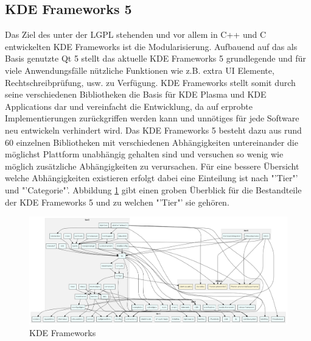 \subsection{KDE Frameworks 5}
Das Ziel des unter der LGPL stehenden und vor allem in C++ und C entwickelten KDE Frameworks ist die Modularisierung. Aufbauend auf das als Basis genutzte Qt 5 stellt das aktuelle KDE Frameworks 5 grundlegende und für viele Anwendungsfälle nützliche Funktionen wie z.B. extra UI Elemente, Rechtschreibprüfung, usw. zu Verfügung. KDE Frameworks stellt somit durch seine verschiedenen Bibliotheken die Basis für KDE Plasma und KDE Applications dar und vereinfacht die Entwicklung, da auf erprobte Implementierungen zurückgriffen werden kann und unnötiges für jede Software neu entwickeln verhindert wird. Das KDE Frameworks 5 besteht dazu aus rund 60 einzelnen Bibliotheken mit verschiedenen Abhängigkeiten untereinander die möglichst Plattform unabhängig gehalten sind und versuchen so wenig wie möglich zusätzliche Abhängigkeiten zu verursachen. Für eine bessere Übersicht welche Abhängigkeiten existieren erfolgt dabei eine Einteilung ist nach "'Tier"' und "'Categorie"'. Abbildung \ref{fig:kde_frameworks} gibt einen groben Überblick für die Bestandteile der KDE Frameworks 5 und zu welchen "'Tier"' sie gehören.

\begin{figure}[h]
	\centering
	\includegraphics[width=\columnwidth]{images/kf5_big_0.png}
	\caption{KDE Frameworks}
	\label{fig:kde_frameworks}
\end{figure}

